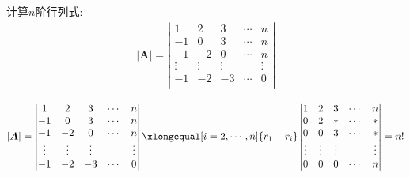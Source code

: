 \documentclass[lang=cn,newtx,10pt,scheme=chinese]{elegantbook}
\begin{document}
\begin{exercise}
    计算$n$阶行列式:
    \begin{gather}
        |\boldsymbol{A}|=\left| \begin{matrix}
            1&		2&		3&		\cdots&		n\\
            -1&		0&		3&		\cdots&		n\\
            -1&		-2&		0&		\cdots&		n\\
            \vdots&		\vdots&		\vdots&		&		\vdots\\
            -1&		-2&		-3&		\cdots&		0\\
        \end{matrix} \right|
        \nonumber
    \end{gather}
    \begin{solution}
        \begin{equation}
            \begin{split}
                |\boldsymbol{A}|=\left| \begin{matrix}
                    1&		2&		3&		\cdots&		n\\
                    -1&		0&		3&		\cdots&		n\\
                    -1&		-2&		0&		\cdots&		n\\
                    \vdots&		\vdots&		\vdots&		&		\vdots\\
                    -1&		-2&		-3&		\cdots&		0\\
                \end{matrix} \right|
                \xlongequal[i=2,\cdots ,n]{r_1+r_i}\left| \begin{matrix}
                    1&		2&		3&		\cdots&		n\\
                    0&		2&		*&		\cdots&		*\\
                    0&		0&		3&		\cdots&		*\\
                    \vdots&		\vdots&		\vdots&		&		\vdots\\
                    0&		0&		0&		\cdots&		n\\
                \end{matrix} \right|=n!
            \end{split}
            \nonumber
        \end{equation}
    \end{solution}
\end{exercise}
\end{document}
